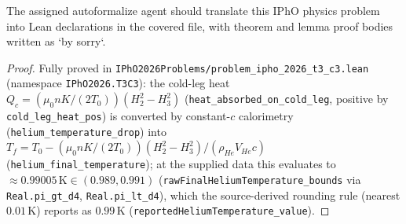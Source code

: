 \begin{theorem}
\label{thm:physics:ipho_2026_t3_c3:target}
\leanok
The assigned autoformalize agent should translate this IPhO physics problem into Lean declarations in the covered file, with theorem and lemma proof bodies written as `by sorry`.
\end{theorem}
\begin{proof}
\leanok
Fully proved in \texttt{IPhO2026Problems/problem\_ipho\_2026\_t3\_c3.lean}
(namespace \texttt{IPhO2026.T3C3}): the cold-leg heat
$Q_c = (\mu_0 n K/(2 T_0))(H_2^2 - H_3^2)$ (\texttt{heat\_absorbed\_on\_cold\_leg},
positive by \texttt{cold\_leg\_heat\_pos}) is converted by constant-$c$
calorimetry (\texttt{helium\_temperature\_drop}) into
$T_f = T_0 - (\mu_0 n K/(2 T_0))(H_2^2 - H_3^2)/(\rho_{He} V_{He} c)$
(\texttt{helium\_final\_temperature}); at the supplied data this evaluates to
$\approx 0.99005\,\mathrm{K} \in (0.989, 0.991)$
(\texttt{rawFinalHeliumTemperature\_bounds} via \texttt{Real.pi\_gt\_d4},
\texttt{Real.pi\_lt\_d4}), which the source-derived rounding rule (nearest
$0.01\,\mathrm{K}$) reports as $0.99\,\mathrm{K}$
(\texttt{reportedHeliumTemperature\_value}).
\end{proof}
